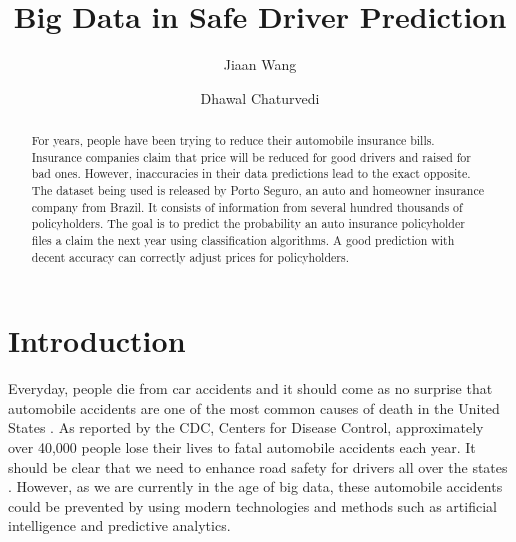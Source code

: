 \title{Big Data in Safe Driver Prediction}

\author{Jiaan Wang}

\author{Dhawal Chaturvedi}
    
\begin{abstract}

    For years, people have been trying to reduce their automobile
    insurance bills. Insurance companies claim that price will be
    reduced for good drivers and raised for bad ones. However,
    inaccuracies in their data predictions lead to the exact
    opposite. The dataset being used is released by Porto Seguro,
    an auto and homeowner insurance company from Brazil. It
    consists of information from several hundred thousands of
    policyholders. The goal is to predict the probability an auto
    insurance policyholder files a claim the next year using
    classification algorithms. A good prediction with decent
    accuracy can correctly adjust prices for policyholders.
    
\end{abstract}


\maketitle

\section{Introduction}

Everyday, people die from car accidents and it should come as no surprise that automobile accidents are one of the most common causes of death in the United States \cite{Suizo2015decisions}. As reported by the CDC, Centers for Disease Control, approximately over 40,000 people lose their lives to fatal automobile accidents each year. It should be clear that we need to enhance road safety for drivers all over the states \cite{Mills2017safety}. However, as we are currently in the age of big data, these automobile accidents could be prevented by using modern technologies and methods such as artificial intelligence and predictive analytics. 

